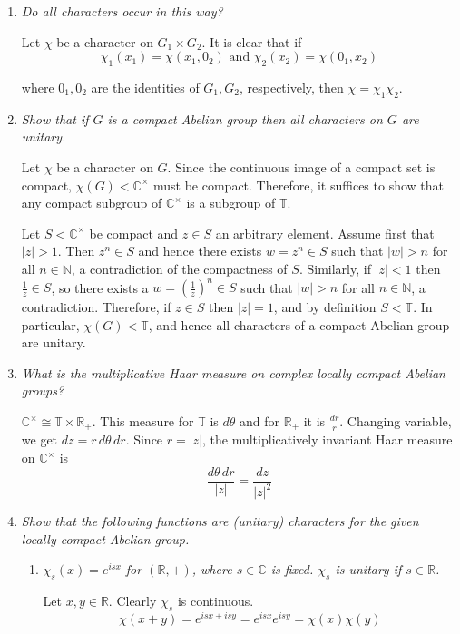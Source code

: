 \documentclass[letterpaper,11pt]{article}
\newcommand{\C}{\mathbb{C}}
\newcommand{\R}{\mathbb{R}}
\newcommand{\N}{\mathbb{N}}
\newcommand{\T}{\mathbb{T}}
\begin{document}
\begin{enumerate}
\item \emph{Do all characters occur in this way?}

Let $\chi$ be a character on $G_1 \times G_2$.  It is clear that if
\[
\chi_1\left(x_1\right) = \chi\left(x_1,0_2\right) \mbox{ and } \chi_2\left(x_2\right) = \chi\left(0_1,x_2\right)
\]

where $0_1,0_2$ are the identities of $G_1, G_2$, respectively, then $\chi = \chi_1 \chi_2$.

\item \emph{Show that if $G$ is a compact Abelian group then all characters on $G$ are unitary.}

Let $\chi$ be a character on $G$.  Since the continuous image of a compact set is compact, $\chi\left(G\right) < \C^\times$ must be compact.  Therefore, it suffices to show that any compact subgroup of $\C^\times$ is a subgroup of $\T$.

Let $S < \C^\times$ be compact and $z \in S$ an arbitrary element.  Assume first that $|z|>1$.  Then $z^n \in S$ and hence there exists $w = z^n \in S$ such that $|w|>n$ for all $n \in \N$, a contradiction of the compactness of $S$.  Similarly, if $|z| < 1$ then $\frac{1}{z} \in S$, so there exists a $w = \left(\frac{1}{z}\right)^n \in S$ such that $|w| > n$ for all $n \in \N$, a contradiction.  Therefore, if $z \in S$ then $|z| = 1$, and by definition $S < \T$.  In particular, $\chi\left(G\right) < \T$, and hence all characters of a compact Abelian group are unitary.

\item \emph{What is the multiplicative Haar measure on complex locally compact Abelian groups?}

$\C^\times \cong \T \times \R_+$.  This measure for $\T$ is $d\theta$ and for $\R_+$ it is $\frac{dr}{r}$.  Changing variable, we get $dz = r\,d\theta\,dr$.  Since $r = |z|$, the multiplicatively invariant Haar measure on $\C^\times$ is
\[
\frac{d\theta\,dr}{|z|} = \frac{dz}{|z|^2}
\]
\item \emph{Show that the following functions are (unitary) characters for the given locally compact Abelian group.}
\begin{enumerate}
\item \emph{$\chi_s(x) = e^{isx}$ for $(\R,+)$, where $s \in \C$ is fixed.  $\chi_s$ is unitary if $s \in \R$.}

Let $x,y \in \R$.  Clearly $\chi_s$ is continuous.
\[
\chi\left(x+y\right) = e^{isx+isy} = e^{isx}e^{isy} = \chi\left(x\right)\chi\left(y\right)
\]


\end{enumerate}
\end{enumerate}
\end{document}
